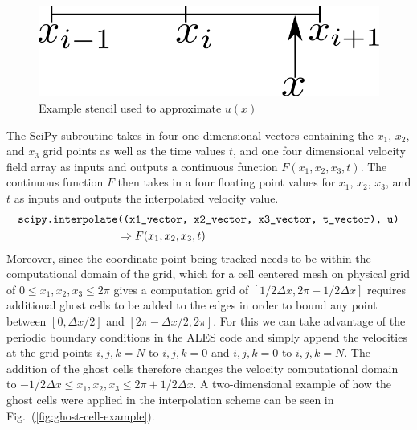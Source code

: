 \begin{figure}[H]
    \includegraphics[height=0.075\textheight]{media/rk4/interpolation}
    \caption{Example stencil used to approximate $u(x)$}
    \label{fig:linear-interp-stencil}
\end{figure}
The SciPy subroutine takes in four one dimensional vectors
containing the $x_{1}$, $x_{2}$, and $x_{3}$ grid points as well as the
time values $t$, and one four dimensional velocity field  array as inputs
and outputs a continuous function $F(x_{1}, x_{2}, x_{3}, t)$. The
continuous function $F$ then takes in a four floating point values for
$x_{1}$, $x_{2}$, $x_{3}$, and $t$ as inputs and outputs the interpolated
velocity value.
\begin{equation}
    \begin{aligned}
        \text{\texttt{scipy.interpolate}}&\text{\texttt{((x1\_vector, x2\_vector, x3\_vector, t\_vector), u)}} \\ 
                & \Rightarrow F(x_{1}, x_{2}, x_{3}, t)
    \end{aligned}
\end{equation}
Moreover, since the coordinate point being tracked needs to be within the
computational domain of the grid, which for a cell centered mesh on
physical grid of $0 \leq x_{1}, x_{2}, x_{3} \leq 2\pi$ gives a computation
grid of $[1/2 \Delta x, 2\pi-1/2 \Delta x]$ requires additional ghost cells
to be added to the edges in order to bound any point between $[0, \Delta
x/2]$ and $[2\pi-\Delta x/2, 2\pi]$.  For this we can take advantage of the
periodic boundary conditions in the ALES code and simply append the
velocities at the grid points $i,j,k=N$ to $i,j,k=0$ and $i,j,k=0$ to
$i,j,k=N$.  The addition of the ghost cells therefore changes the velocity
computational domain to $-1/2 \Delta x \leq x_{1}, x_{2}, x_{3} \leq 2\pi +
1/2 \Delta x$. A two-dimensional example of how the ghost cells were
applied in the interpolation scheme can be seen in
Fig.~(\ref{fig:ghost-cell-example}).
